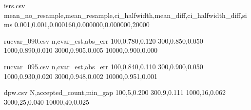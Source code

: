 \begin{filecontents*}{isrs.csv}
mean_no_resample,mean_resample,ci_halfwidth,mean_diff,ci_halfwidth_diff,sims
0.001,0.001,0.000160,0.000000,0.000000,20000
\end{filecontents*}

\begin{filecontents*}{rucvar_090.csv}
n,cvar_est,abs_err
100,0.780,0.120
300,0.850,0.050
1000,0.890,0.010
3000,0.905,0.005
10000,0.900,0.000
\end{filecontents*}

\begin{filecontents*}{rucvar_095.csv}
n,cvar_est,abs_err
100,0.840,0.110
300,0.900,0.050
1000,0.930,0.020
3000,0.948,0.002
10000,0.951,0.001
\end{filecontents*}

\begin{filecontents*}{dpw.csv}
N,accepted_count,min_gap
100,5,0.200
300,9,0.111
1000,16,0.062
3000,25,0.040
10000,40,0.025
\end{filecontents*}

\documentclass[10pt]{article}
\usepackage[margin=1in]{geometry}
\usepackage[T1]{fontenc}
\usepackage{lmodern}
\usepackage{textcomp}
\usepackage{amsmath,amssymb,amsfonts,amsthm}
\usepackage{mathtools}
\usepackage{graphicx}
\usepackage{booktabs}
\usepackage{algorithm}
\usepackage{algpseudocode}
\usepackage{enumitem}
\usepackage{microtype}
\usepackage{hyperref}
\usepackage[capitalise,nameinlink]{cleveref}
\usepackage{xspace}
\usepackage{adjustbox}
\usepackage{pgfplots}
\usepackage{pgfplotstable}
\usepackage{verbatim}
\usepackage{float}
\pgfplotsset{compat=1.17}

\newcommand{\sCRF}{\textsc{Street\textendash CRF}\xspace}
\newcommand{\CFRplus}{\ensuremath{\mathrm{CFR}^{+}}\xspace}
\newcommand{\E}{\mathbb{E}}
\newcommand{\Var}{\mathrm{Var}}
\newcommand{\KL}{\mathrm{KL}}
\newcommand{\CVaR}{\mathrm{CVaR}}
\newcommand{\VaR}{\mathrm{VaR}}
\newcommand{\BR}{\mathrm{BR}}
\newcommand{\States}{\mathcal{S}}
\newcommand{\Actions}{\mathcal{A}}
\newcommand{\IS}{\mathcal{I}}
\newcommand{\Players}{\mathcal{N}}
\newcommand{\Chance}{\mathsf{C}}
\newcommand{\Bel}{\rho}
\newcommand{\1}{\mathbf{1}}
\newcommand{\R}{\mathbb{R}}

\theoremstyle{plain}
\newtheorem{definition}{Definition}
\newtheorem{assumption}{Assumption}
\newtheorem{lemma}{Lemma}
\newtheorem{proposition}{Proposition}
\newtheorem{theorem}{Theorem}
\newtheorem{corollary}{Corollary}

